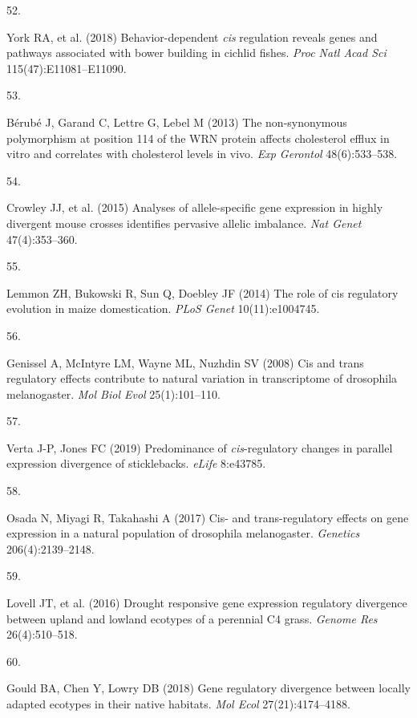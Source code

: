 \documentclass[9pt,twocolumn,twoside,lineno]{pnas-new}
\newlength{\cslhangindent}
\newlength{\csllabelwidth}
\newlength{\cslentryspacingunit} %
\newenvironment{CSLReferences}[2] %
 {%
  \setlength{\parindent}{0pt}
  \ifodd #1
  \let\oldpar\par
  \def\par{\hangindent=\cslhangindent\oldpar}
  \fi
  \setlength{\parskip}{#2\cslentryspacingunit}
 }%
 {}
\newcommand{\CSLLeftMargin}[1]{\parbox[t]{\csllabelwidth}{#1}}
\newcommand{\CSLRightInline}[1]{\parbox[t]{\linewidth - \csllabelwidth}{#1}\break}
\begin{document}
\begin{CSLReferences}{0}{0}
\leavevmode\hypertarget{ref-York2018}{}%
\CSLLeftMargin{52. }
\CSLRightInline{York RA, et al. (2018) Behavior-dependent \emph{cis}
regulation reveals genes and pathways associated with bower building in
cichlid fishes. \emph{Proc Natl Acad Sci} 115(47):E11081--E11090.}

\leavevmode\hypertarget{ref-Berube2013}{}%
\CSLLeftMargin{53. }
\CSLRightInline{Bérubé J, Garand C, Lettre G, Lebel M (2013) The
non-synonymous polymorphism at position 114 of the {WRN} protein affects
cholesterol efflux in vitro and correlates with cholesterol levels in
vivo. \emph{Exp Gerontol} 48(6):533--538.}

\leavevmode\hypertarget{ref-Crowley2015}{}%
\CSLLeftMargin{54. }
\CSLRightInline{Crowley JJ, et al. (2015) Analyses of allele-specific
gene expression in highly divergent mouse crosses identifies pervasive
allelic imbalance. \emph{Nat Genet} 47(4):353--360.}

\leavevmode\hypertarget{ref-Lemmon2014}{}%
\CSLLeftMargin{55. }
\CSLRightInline{Lemmon ZH, Bukowski R, Sun Q, Doebley JF (2014) The role
of cis regulatory evolution in maize domestication. \emph{PLoS Genet}
10(11):e1004745.}

\leavevmode\hypertarget{ref-Genissel2008}{}%
\CSLLeftMargin{56. }
\CSLRightInline{Genissel A, McIntyre LM, Wayne ML, Nuzhdin SV (2008) Cis
and trans regulatory effects contribute to natural variation in
transcriptome of drosophila melanogaster. \emph{Mol Biol Evol}
25(1):101--110.}

\leavevmode\hypertarget{ref-Verta2019}{}%
\CSLLeftMargin{57. }
\CSLRightInline{Verta J-P, Jones FC (2019) Predominance of
\emph{cis}-regulatory changes in parallel expression divergence of
sticklebacks. \emph{eLife} 8:e43785.}

\leavevmode\hypertarget{ref-Osada2017}{}%
\CSLLeftMargin{58. }
\CSLRightInline{Osada N, Miyagi R, Takahashi A (2017) Cis- and
trans-regulatory effects on gene expression in a natural population of
drosophila melanogaster. \emph{Genetics} 206(4):2139--2148.}

\leavevmode\hypertarget{ref-Lovell2016}{}%
\CSLLeftMargin{59. }
\CSLRightInline{Lovell JT, et al. (2016) Drought responsive gene
expression regulatory divergence between upland and lowland ecotypes of
a perennial {C4} grass. \emph{Genome Res} 26(4):510--518.}

\leavevmode\hypertarget{ref-Gould2018}{}%
\CSLLeftMargin{60. }
\CSLRightInline{Gould BA, Chen Y, Lowry DB (2018) Gene regulatory
divergence between locally adapted ecotypes in their native habitats.
\emph{Mol Ecol} 27(21):4174--4188.}


\end{CSLReferences}
\end{document}
